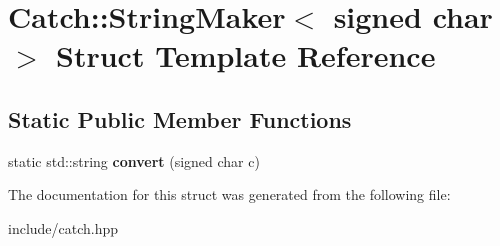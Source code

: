 \hypertarget{structCatch_1_1StringMaker_3_01signed_01char_01_4}{}\section{Catch\+:\+:String\+Maker$<$ signed char $>$ Struct Template Reference}
\label{structCatch_1_1StringMaker_3_01signed_01char_01_4}
\subsection*{Static Public Member Functions}
\begin{DoxyCompactItemize}
\item 
static std\+::string {\bfseries convert} (signed char c)\hypertarget{structCatch_1_1StringMaker_3_01signed_01char_01_4_a5ec41f32916539dc90130539db8222cf}{}\label{structCatch_1_1StringMaker_3_01signed_01char_01_4_a5ec41f32916539dc90130539db8222cf}

\end{DoxyCompactItemize}


The documentation for this struct was generated from the following file\+:\begin{DoxyCompactItemize}
\item 
include/catch.\+hpp\end{DoxyCompactItemize}
